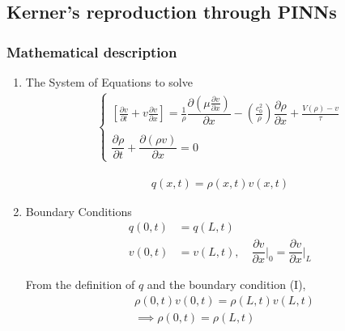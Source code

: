 \documentclass[11pt]{article}
\begin{document}
\subsection{Kerner's reproduction through PINNs}
\label{sec:org5f4cafb}
\subsubsection{Mathematical description}
\label{sec:org0c3afa8}
\begin{enumerate}
\item The System of Equations to solve
\label{sec:orgcf7cfb0}
\begin{equation}
\begin{aligned}
\begin{cases}
\label{eq:NS-n1}
\left[\frac{\partial{v}}{\partial{t}} + v\frac{\partial{v}}{\partial{x}} \right] = \frac{1}{\rho{}}\dfrac{\partial \left(\mu \frac{\partial{v}}{\partial{x}} \right)}{\partial{x}} - \left(\frac{c_0^2}{\rho{}}\right)\dfrac{\partial{\rho}}{\partial{x}} + \frac{V(\rho) - v}{\tau} \\\\
     \dfrac{\partial{\rho}}{\partial{t}} + \dfrac{\partial{\left( \rho{}v \right)}}{\partial{x}}=0
\end{cases}
   \end{aligned}
 \end{equation}

\begin{equation}
\begin{aligned}
q(x,t)=\rho(x,t)v(x,t)
\end{aligned}
\end{equation}

\item Boundary Conditions
\label{sec:orgccee43e}
\begin{equation}
\begin{aligned}
q(0,t) &= q(L,t)\\
v(0,t) &= v(L,t),\quad \dfrac{\partial{v}}{\partial{x}}\biggr\rvert_0 = \dfrac{\partial{v}}{\partial{x}}\biggr\rvert_L
\end{aligned}
\end{equation}

From the definition of \(q\) and the boundary condition (I),
\begin{equation}
\begin{aligned}
&\rho(0,t)v(0,t) = \rho(L,t)v(L,t) \\
&\implies \rho(0,t) = \rho(L,t)
\end{aligned}
\end{equation}
\end{enumerate}
\end{document}
